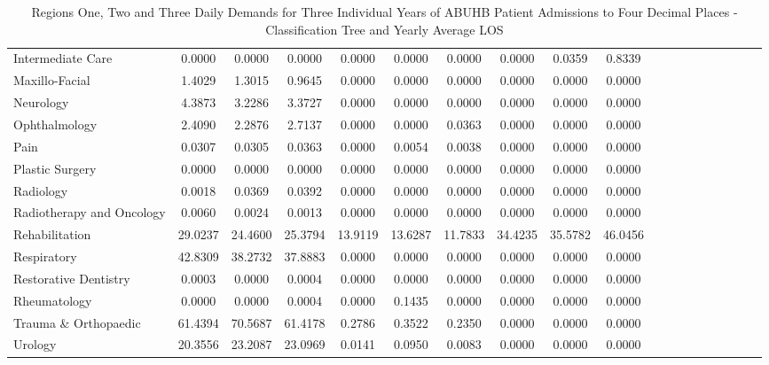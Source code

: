 \documentclass[thesis.tex]{subfiles}
\begin{document}
\begin{landscape}
\begin{table}[h!]
{\begin{tabular}{lcccccccccccccccccc}
Intermediate Care	&0.0000&	0.0000&	0.0000&	0.0000&	0.0000&	0.0000&	0.0000&	0.0359&	0.8339\\
Maxillo-Facial&	1.4029&	1.3015&	0.9645&	0.0000&	0.0000&	0.0000&	0.0000&	0.0000&	0.0000\\
Neurology&	4.3873&	3.2286&	3.3727&	0.0000&	0.0000&	0.0000&	0.0000&	0.0000&	0.0000\\
Ophthalmology&	2.4090&	2.2876&	2.7137&	0.0000&	0.0000&	0.0363&	0.0000&	0.0000&	0.0000\\
Pain&	0.0307&	0.0305&	0.0363&	0.0000&	0.0054&	0.0038&	0.0000&	0.0000&	0.0000\\
Plastic Surgery	&0.0000&	0.0000&	0.0000&	0.0000&	0.0000&	0.0000&	0.0000&	0.0000&	0.0000\\
Radiology&	0.0018&	0.0369&	0.0392&	0.0000&	0.0000&	0.0000&	0.0000&	0.0000&	0.0000\\
Radiotherapy and Oncology&	0.0060&	0.0024&	0.0013&	0.0000&	0.0000&	0.0000&	0.0000&	0.0000&	0.0000\\
Rehabilitation&	29.0237&	24.4600&	25.3794&	13.9119&	13.6287&	11.7833&	34.4235&	35.5782&	46.0456\\
Respiratory&	42.8309&	38.2732&	37.8883&	0.0000&	0.0000&	0.0000&	0.0000&	0.0000&	0.0000\\
Restorative Dentistry	&0.0003&	0.0000&	0.0004&	0.0000&	0.0000&	0.0000&	0.0000&	0.0000&	0.0000\\
Rheumatology&	0.0000&	0.0000&	0.0004&	0.0000&	0.1435&	0.0000&	0.0000&	0.0000&	0.0000\\
Trauma \& Orthopaedic&	61.4394&	70.5687&	61.4178&	0.2786&	0.3522&	0.2350&	0.0000&	0.0000&	0.0000\\
Urology&	20.3556&	23.2087&	23.0969&	0.0141&	0.0950&	0.0083&	0.0000&	0.0000&	0.0000\\

\bottomrule
\end{tabular}  } 
\caption{Regions One, Two and Three Daily Demands for Three Individual Years of ABUHB Patient Admissions to Four Decimal Places - Classification Tree and Yearly Average LOS}
    \label{apptab:LinkedDemands8a}
\end{table}  



\begin{table}[h!]
    \centering{}
\end{table}
\end{landscape}
\end{document}
